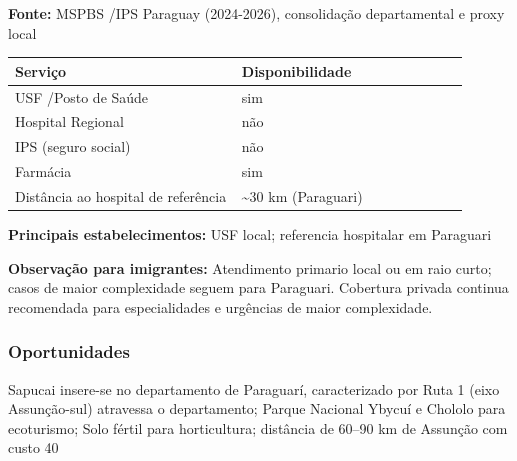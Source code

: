 \textbf{Fonte:} MSPBS /\allowbreak  IPS Paraguay (2024-2026), consolidação
departamental e proxy local

{\def\LTcaptype{none} %
\begin{longtable}{@{}>{\raggedright\arraybackslash}p{0.45\linewidth} >{\raggedright\arraybackslash}p{0.45\linewidth}@{}}
\toprule\noalign{}
Serviço & Disponibilidade \\
\midrule\noalign{}
\endhead
\bottomrule\noalign{}
\endlastfoot
USF /\allowbreak  Posto de Saúde & sim \\
Hospital Regional & não \\
IPS (seguro social) & não \\
Farmácia & sim \\
Distância ao hospital de referência & \textasciitilde30 km
(Paraguari) \\
\end{longtable}
}

\textbf{Principais estabelecimentos:} USF local; referencia hospitalar
em Paraguari

\textbf{Observação para imigrantes:} Atendimento primario local ou em
raio curto; casos de maior complexidade seguem para Paraguari. Cobertura
privada continua recomendada para especialidades e urgências de maior
complexidade.
\newpage

\subsubsection*{Oportunidades}\label{oport-sapucai-0913}
Sapucai insere-se no departamento de Paraguarí, caracterizado por Ruta 1 (eixo Assunção-sul) atravessa o departamento; Parque Nacional Ybycuí e Chololo para ecoturismo; Solo fértil para horticultura; distância de 60–90 km de Assunção com custo 40%

